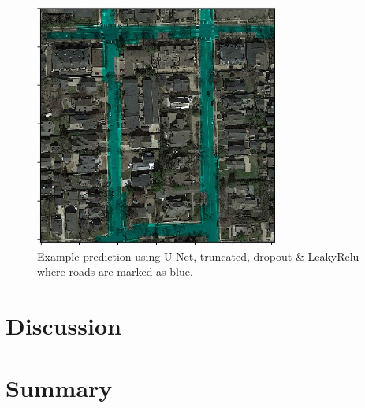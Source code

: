 \documentclass[10pt,conference,compsocconf]{IEEEtran}
\begin{document}
\begin{figure}
\includegraphics[width={8cm}]{result}
\caption{Example prediction using U-Net, truncated, dropout \& LeakyRelu where roads are marked as blue.}
\label{fig:result}
\end{figure}


\section{Discussion}

\section{Summary}




\end{document}

